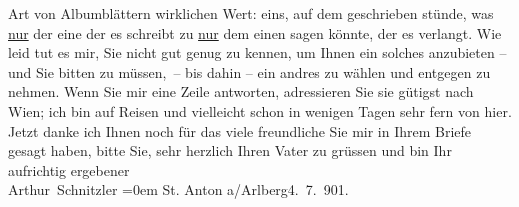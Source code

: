 \begin{ledgroupsized}[t]{13cm}
               Art von Albumblättern wirklichen Wert: eins, auf dem geschrieben stünde, was \uline{nur} der eine der es schreibt zu \uline{nur} dem einen sagen könnte, der es verlangt. Wie leid tut es mir, Sie
               nicht gut genug zu kennen, um Ihnen ein solches anzubieten – und Sie bitten zu
               müssen, – bis dahin – ein andres zu wählen und entgegen zu nehmen.\pend
           \pstart
           Wenn Sie mir eine Zeile antworten, adressieren Sie sie gütigst nach Wien; ich bin auf Reisen und vielleicht schon in wenigen Tagen
               sehr fern von hier.\pend
           \pstart
           Jetzt danke ich Ihnen noch für das viele freundliche \label{T_L01141-1v}\label{T_L01141-1h} Sie mir in Ihrem Briefe gesagt haben, bitte Sie,
               sehr herzlich Ihren Vater zu
               grüssen und bin\pend
           \pstart
           Ihr aufrichtig ergebener{\\[\baselineskip]}\spacefill\mbox{Arthur Schnitzler}\pend
           \leftskip=0em{}\pstart
           St. Anton a/Arlberg4. 7. 901.\pend
           
         
         \endnumbering{}\end{ledgroupsized}  \newcommand{\dateiname}{L01141}\newcommand{\titel}{Arthur Schnitzler an Edith Brandes, 4. 7. 1901}\newcommand{\editorInnen}{Martin Anton Müller und Gerd-Hermann Susen}
      